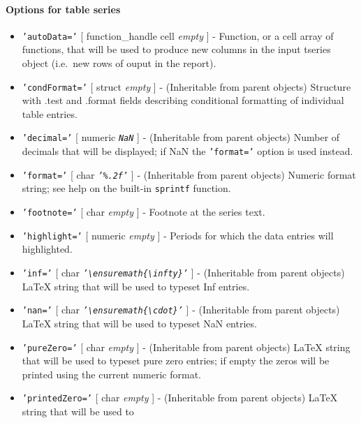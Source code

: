  \paragraph{Options for table series}
 
 \begin{itemize}
 \item
   \texttt{'autoData='} {[} function\_handle \textbar{} cell \textbar{}
   \emph{empty} {]} - Function, or a cell array of functions, that will
   be used to produce new columns in the input tseries object (i.e.~new
   rows of ouput in the report).
 \item
   \texttt{'condFormat='} {[} struct \textbar{} \emph{empty} {]} -
   (Inheritable from parent objects) Structure with .test and .format
   fields describing conditional formatting of individual table entries.
 \item
   \texttt{'decimal='} {[} numeric \textbar{} \emph{\texttt{NaN}} {]} -
   (Inheritable from parent objects) Number of decimals that will be
   displayed; if NaN the \texttt{'format='} option is used instead.
 \item
   \texttt{'format='} {[} char \textbar{} \emph{\texttt{'\%.2f'}} {]} -
   (Inheritable from parent objects) Numeric format string; see help on
   the built-in \texttt{sprintf} function.
 \item
   \texttt{'footnote='} {[} char \textbar{} \emph{empty} {]} - Footnote
   at the series text.
 \item
   \texttt{'highlight='} {[} numeric \textbar{} \emph{empty} {]} -
   Periods for which the data entries will highlighted.
 \item
   \texttt{'inf='} {[} char \textbar{}
   \emph{\texttt{'\textbackslash{}ensuremath\{\textbackslash{}infty\}'}}
   {]} - (Inheritable from parent objects) LaTeX string that will be used
   to typeset Inf entries.
 \item
   \texttt{'nan='} {[} char \textbar{}
   \emph{\texttt{'\textbackslash{}ensuremath\{\textbackslash{}cdot\}'}}
   {]} - (Inheritable from parent objects) LaTeX string that will be used
   to typeset NaN entries.
 \item
   \texttt{'pureZero='} {[} char \textbar{} \emph{empty} {]} -
   (Inheritable from parent objects) LaTeX string that will be used to
   typeset pure zero entries; if empty the zeros will be printed using
   the current numeric format.
 \item
   \texttt{'printedZero='} {[} char \textbar{} \emph{empty} {]} -
   (Inheritable from parent objects) LaTeX string that will be used to

\end{itemize}
